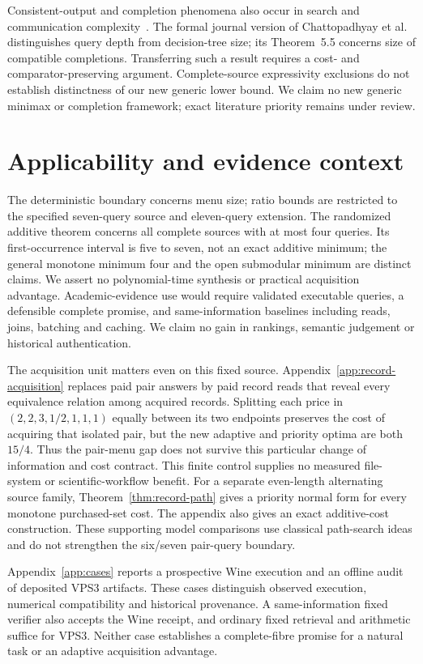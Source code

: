 \documentclass[pdflatex,sn-mathphys-num]{sn-jnl}
\theoremstyle{thmstyleone}
\theoremstyle{thmstylethree}
\theoremstyle{thmstyletwo}
\begin{document}
Consistent-output and completion phenomena also occur in search and communication complexity~\cite{chattopadhyay2025pseudo,goos2026pseudo,watson2026pseudo}. The formal journal version of Chattopadhyay et al. distinguishes query depth from decision-tree size; its Theorem~5.5 concerns size of compatible completions. Transferring such a result requires a cost- and comparator-preserving argument. Complete-source expressivity exclusions do not establish distinctness of our new generic lower bound. We claim no new generic minimax or completion framework; exact literature priority remains under review.

\section{Applicability and evidence context}\label{app:scope-context}
The deterministic boundary concerns menu size; ratio bounds are restricted to the specified seven-query source and eleven-query extension. The randomized additive theorem concerns all complete sources with at most four queries. Its first-occurrence interval is five to seven, not an exact additive minimum; the general monotone minimum four and the open submodular minimum are distinct claims. We assert no polynomial-time synthesis or practical acquisition advantage. Academic-evidence use would require validated executable queries, a defensible complete promise, and same-information baselines including reads, joins, batching and caching. We claim no gain in rankings, semantic judgement or historical authentication.

The acquisition unit matters even on this fixed source. Appendix~\ref{app:record-acquisition} replaces paid pair answers by paid record reads that reveal every equivalence relation among acquired records. Splitting each price in $(2,2,3,1/2,1,1,1)$ equally between its two endpoints preserves the cost of acquiring that isolated pair, but the new adaptive and priority optima are both $15/4$. Thus the pair-menu gap does not survive this particular change of information and cost contract. This finite control supplies no measured file-system or scientific-workflow benefit. For a separate even-length alternating source family, Theorem~\ref{thm:record-path} gives a priority normal form for every monotone purchased-set cost. The appendix also gives an exact additive-cost construction. These supporting model comparisons use classical path-search ideas and do not strengthen the six/seven pair-query boundary.

Appendix~\ref{app:cases} reports a prospective Wine execution and an offline audit of deposited VPS3 artifacts. These cases distinguish observed execution, numerical compatibility and historical provenance. A same-information fixed verifier also accepts the Wine receipt, and ordinary fixed retrieval and arithmetic suffice for VPS3. Neither case establishes a complete-fibre promise for a natural task or an adaptive acquisition advantage.
\end{document}
